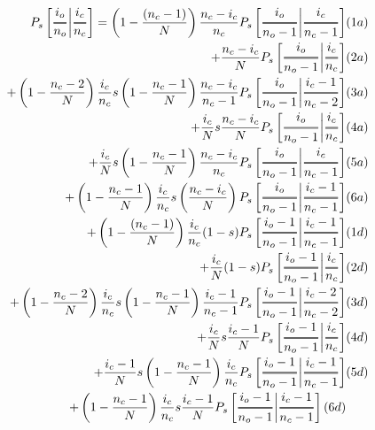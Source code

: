 \documentclass[preview]{standalone}
\newcommand{\Dfrac}[2]{%
  \ooalign{%
    $\genfrac{}{}{1.2pt}0{#1}{#2}$\cr%
    $\color{white}\genfrac{}{}{.4pt}0{\phantom{#1}}{\phantom{#2}}$}%
}
\newcommand{\cond}{\middle\vert}
\begin{document}
\begin{equation*}
  \begin{aligned}
    P_s\left[ \Dfrac{i_o}{n_o} \cond \Dfrac{i_c}{n_c} \right]
    = \left(1-\frac{(n_c-1)}{N}\right)\frac{n_c-i_c}{n_c} P_s\left[ \Dfrac{i_o}{n_o-1} \cond
      \Dfrac{i_c}{n_c-1} \right]& (1a)\\ %
      + \frac{n_c-i_c}{N} P_s\left[ \Dfrac{i_o}{n_o-1} \cond \Dfrac{i_c}{n_c} \right]& (2a)\\ %
    + \left(1-\frac{n_c-2}{N}\right) \frac{i_c}{n_c} s  \left(1-\frac{n_c-1}{N}\right)
      \frac{n_c-i_c}{n_c-1} P_s\left[ \Dfrac{i_o}{n_o-1} \cond \Dfrac{i_c-1}{n_c-2} \right]& (3a) \\ %
    + \frac{i_c}{N} s  \frac{n_c-i_c}{N}  P_s\left[ \Dfrac{i_o}{n_o-1} \cond \Dfrac{i_c}{n_c}
      \right]  &  (4a) \\ %
    + \frac{i_c}{N} s  \left(1-\frac{n_c-1}{N}\right) \frac{n_c-i_c}{n_c}  P_s\left[
        \Dfrac{i_o}{n_o-1} \cond \Dfrac{i_c}{n_c-1} \right]& (5a) \\ %
    + \left(1-\frac{n_c-1}{N}\right) \frac{i_c}{n_c} s  \left(\frac{ n_c-i_c }{N}\right) P_s\left[
        \Dfrac{i_o}{n_o-1} \cond \Dfrac{i_c-1}{n_c-1} \right]& (6a) \\ %
    + \left(1-\frac{(n_c-1)}{N}\right)\frac{i_c}{n_c} (1-s) P_s\left[ \Dfrac{i_o-1}{n_o-1} \cond
      \Dfrac{i_c-1}{n_c-1} \right]& (1d) \\ %
      + \frac{i_c}{N} (1-s) P_s\left[ \Dfrac{i_o-1}{n_o-1} \cond \Dfrac{i_c}{n_c} \right]& (2d) \\ %
    + \left(1-\frac{n_c-2}{N}\right) \frac{i_c}{n_c} s  \left(1-\frac{n_c-1}{N}\right)
      \frac{i_c-1}{n_c-1} P_s\left[ \Dfrac{i_o-1}{n_o-1} \cond \Dfrac{i_c-2}{n_c-2} \right]& (3d) \\ %
    + \frac{i_c}{N} s  \frac{i_c-1}{N}   P_s\left[ \Dfrac{i_o-1}{n_o-1} \cond \Dfrac{i_c}{n_c}
      \right]& (4d) \\ %
    + \frac{i_c-1}{N} s  \left(1-\frac{n_c-1}{N}\right) \frac{i_c}{n_c}   P_s\left[
        \Dfrac{i_o-1}{n_o-1} \cond \Dfrac{i_c-1}{n_c-1} \right]& (5d) \\ %
    + \left(1-\frac{n_c-1}{N}\right) \frac{i_c}{n_c} s \frac{i_c-1}{N} P_s\left[
        \Dfrac{i_o-1}{n_o-1} \cond \Dfrac{i_c-1}{n_c-1} \right] (6d) %
  \end{aligned}
\end{equation*}
\end{document}
